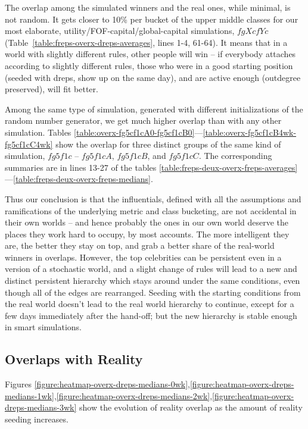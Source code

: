 \documentclass[10pt,oneside]{memoir}
\begin{document}
The overlap among the simulated winners and the real ones, while minimal, is not random.  It gets closer to 10\% per bucket of the upper middle classes for our most elaborate, utility/FOF-capital/global-capital simulations, $fgXcfYc$ (Table~\ref{table:freps-overx-dreps-averages}, lines 1-4, 61-64).  It means that in a world with slightly different rules, other people will win -- if everybody attaches according to slightly different rules, those who were in a good starting position (seeded with dreps, show up on the same day), and are active enough (outdegree preserved), will fit better.


Among the same type of simulation, generated with different initializations of the random number generator, we get much higher overlap than with any other simulation.  Tables \ref{table:overx-fg5cf1cA0-fg5cf1cB0}---\ref{table:overx-fg5cf1cB4wk-fg5cf1cC4wk} show the overlap for three distinct groups of the same kind of simulation, $fg5f1c$ -- $fg5f1cA$, $fg5f1cB$, and $fg5f1cC$.  The corresponding summaries are in lines 13-27 of the tables \ref{table:freps-deux-overx-freps-averages}---\ref{table:freps-deux-overx-freps-medians}.


Thus our conclusion is that the influentials, defined with all the assumptions and ramifications of the underlying metric and class bucketing, are not accidental in their own worlds -- and hence probably the ones in our own world deserve the places they work hard to occupy, by most accounts.  The more intelligent they are, the better they stay on top, and grab a better share of the real-world winners in overlaps.  However, the top celebrities can be persistent even in a version of a stochastic world, and a slight change of rules will lead to a new and distinct persistent hierarchy which stays around under the same conditions, even though all of the edges are rearranged.  Seeding with the starting conditions from the real world doesn't lead to the real world hierarchy to continue, except for a few days immediately after the hand-off; but the new hierarchy is stable enough in smart simulations.


\subsection{Overlaps with Reality}
\label{overlapswithreality}

Figures \ref{figure:heatmap-overx-dreps-medians-0wk},\ref{figure:heatmap-overx-dreps-medians-1wk},\ref{figure:heatmap-overx-dreps-medians-2wk},\ref{figure:heatmap-overx-dreps-medians-3wk} show the evolution of reality overlap as the amount of reality seeding increases.  
\end{document}
